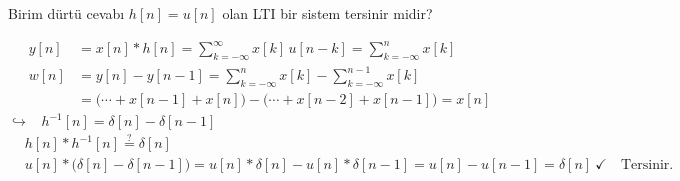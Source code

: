 \documentclass[11pt,a4paper]{article}
\begin{document}
\begin{ornek}[(Ex)]
Birim dürtü cevabı $h[n] = u[n]$ olan LTI bir sistem tersinir midir?
\end{ornek}
\begin{cozum}
\begin{center}
\end{center}
\begin{align*}
  y[n] &= x[n] \ast h[n] = \sum_{k=-\infty}^{\infty} x[k]\,u[n-k] = \sum_{k=-\infty}^{n} x[k] \\
  w[n] &= y[n] - y[n-1] = \sum_{k=-\infty}^{n} x[k] - \sum_{k=-\infty}^{n-1} x[k] \\
  &= \bigl(\cdots + x[n-1] + x[n]\bigr) - \bigl(\cdots + x[n-2] + x[n-1]\bigr) = x[n]
\end{align*}
$\hookrightarrow$ \ $h^{-1}[n] = \delta[n] - \delta[n-1]$
\begin{align*}
  & h[n] \ast h^{-1}[n] \overset{?}{=} \delta[n] \\
  & u[n] \ast \bigl(\delta[n] - \delta[n-1]\bigr) = u[n] \ast \delta[n] - u[n] \ast \delta[n-1] = u[n] - u[n-1] = \delta[n] \ \checkmark \quad \text{Tersinir.}
\end{align*}
\end{cozum}
\end{document}
